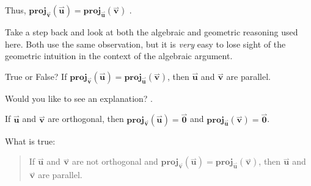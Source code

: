 \documentclass{ximera}
\begin{document}
\begin{exercise}
\begin{selectAll}
\begin{hint}
\begin{problem}
\begin{question}
\begin{itemize}
Thus,  $\mathbf{proj}_{\overset{\boldsymbol{\rightharpoonup}}{\mathbf{v}}}(\overset{\boldsymbol{\rightharpoonup}}{\mathbf{u}}) = \mathbf{proj}_{\overset{\boldsymbol{\rightharpoonup}}{\mathbf{u}}}(\overset{\boldsymbol{\rightharpoonup}}{\mathbf{v}})$  .

\end{itemize}

Take a step back and look at both the algebraic and geometric reasoning used here.  Both use the same observation, but it is \emph{very} easy to lose sight of the geometric intuition in the context of the algebraic argument.
\end{question}
\end{problem}
\begin{problem}
True or False?  If $\mathbf{proj}_{\overset{\boldsymbol{\rightharpoonup}}{\mathbf{v}}}(\overset{\boldsymbol{\rightharpoonup}}{\mathbf{u}}) = \mathbf{proj}_{\overset{\boldsymbol{\rightharpoonup}}{\mathbf{u}}}(\overset{\boldsymbol{\rightharpoonup}}{\mathbf{v}})$, then $\overset{\boldsymbol{\rightharpoonup}}{\mathbf{u}}$ and $\overset{\boldsymbol{\rightharpoonup}}{\mathbf{v}}$ are parallel.

Would you like to see an explanation?
.

\begin{question}
If $\overset{\boldsymbol{\rightharpoonup}}{\mathbf{u}}$ and $\overset{\boldsymbol{\rightharpoonup}}{\mathbf{v}}$ are orthogonal, then $\mathbf{proj}_{\overset{\boldsymbol{\rightharpoonup}}{\mathbf{v}}}(\overset{\boldsymbol{\rightharpoonup}}{\mathbf{u}}) = \overset{\boldsymbol{\rightharpoonup}}{\mathbf{0}}$ and $\mathbf{proj}_{\overset{\boldsymbol{\rightharpoonup}}{\mathbf{u}}}(\overset{\boldsymbol{\rightharpoonup}}{\mathbf{v}}) = \overset{\boldsymbol{\rightharpoonup}}{\mathbf{0}}$.  

What is true:

\begin{quote}
If $\overset{\boldsymbol{\rightharpoonup}}{\mathbf{u}}$ and $\overset{\boldsymbol{\rightharpoonup}}{\mathbf{v}}$ are not orthogonal and $\mathbf{proj}_{\overset{\boldsymbol{\rightharpoonup}}{\mathbf{v}}}(\overset{\boldsymbol{\rightharpoonup}}{\mathbf{u}}) = \mathbf{proj}_{\overset{\boldsymbol{\rightharpoonup}}{\mathbf{u}}}(\overset{\boldsymbol{\rightharpoonup}}{\mathbf{v}})$, then $\overset{\boldsymbol{\rightharpoonup}}{\mathbf{u}}$ and $\overset{\boldsymbol{\rightharpoonup}}{\mathbf{v}}$ are parallel.
\end{quote}


\end{question}
\end{problem}
\end{hint}
\end{selectAll}
\end{exercise}
\end{document}
